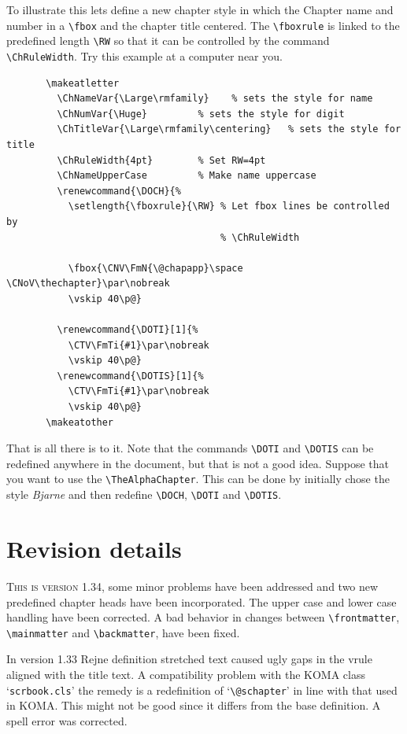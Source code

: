 \documentclass{report}
\newcommand{\A}[1]{{\texttt{\textbackslash #1}}}
\begin{document}
    To illustrate this lets define a new chapter style in which the
    Chapter name and number in a \A{fbox} and the chapter title
    centered. The \A{fboxrule} is linked to the predefined length
    \A{RW} so that it can be controlled by the command
    \A{ChRuleWidth}. Try this example at a computer near you.
    \begin{verbatim}
       \makeatletter
         \ChNameVar{\Large\rmfamily}    % sets the style for name
         \ChNumVar{\Huge}         % sets the style for digit
         \ChTitleVar{\Large\rmfamily\centering}   % sets the style for title
         \ChRuleWidth{4pt}        % Set RW=4pt
         \ChNameUpperCase         % Make name uppercase
         \renewcommand{\DOCH}{%
           \setlength{\fboxrule}{\RW} % Let fbox lines be controlled by
                                      % \ChRuleWidth

           \fbox{\CNV\FmN{\@chapapp}\space \CNoV\thechapter}\par\nobreak
           \vskip 40\p@}

         \renewcommand{\DOTI}[1]{%
           \CTV\FmTi{#1}\par\nobreak
           \vskip 40\p@}
         \renewcommand{\DOTIS}[1]{%
           \CTV\FmTi{#1}\par\nobreak
           \vskip 40\p@}
       \makeatother
    \end{verbatim}
    That is all there is to it. Note that the commands \A{DOTI} and
    \A{DOTIS} can be redefined anywhere in the document, but that is
    not a good idea. Suppose that you want to use the
    \A{TheAlphaChapter}. This can be done by initially chose the style
    {\em Bjarne}\/ and then redefine \A{DOCH}, \A{DOTI} and \A{DOTIS}.

    \chapter{Revision details}
     \lettrine{T}{his is version 1.34}, some minor problems have been
     addressed and two new predefined chapter heads have been
     incorporated. The upper case and lower case handling have been
     corrected. A bad behavior in changes between \verb+\frontmatter+,
     \verb+\mainmatter+ and  \verb+\backmatter+, have been fixed.   

     In version 1.33 Rejne definition stretched text caused ugly gaps
     in the vrule aligned with the title text. A compatibility problem
     with the KOMA class `\verb+scrbook.cls+' the remedy is a redefinition
     of `\verb+\@schapter+' in line with that used in KOMA. This might not
     be good since it differs from the base definition. A spell error was
     corrected.
 
\end{document}
